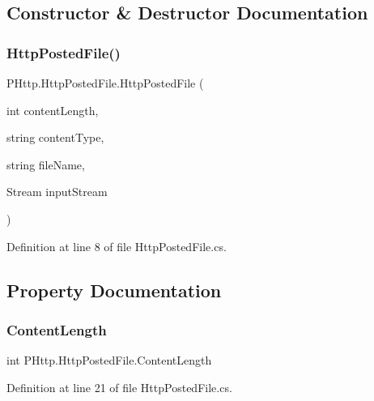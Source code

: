 \subsection{Constructor \& Destructor Documentation}
\mbox{\label{class_p_http_1_1_http_posted_file_a81377359a071ee5808f7e99bb80d6a29}} 
\subsubsection{\texorpdfstring{Http\+Posted\+File()}{HttpPostedFile()}}
{\footnotesize\ttfamily P\+Http.\+Http\+Posted\+File.\+Http\+Posted\+File (\begin{DoxyParamCaption}\item[{int}]{content\+Length,  }\item[{string}]{content\+Type,  }\item[{string}]{file\+Name,  }\item[{Stream}]{input\+Stream }\end{DoxyParamCaption})}



Definition at line 8 of file Http\+Posted\+File.\+cs.



\subsection{Property Documentation}
\mbox{\label{class_p_http_1_1_http_posted_file_ad3e3b683b2e745613493026d1e9dec48}} 
\subsubsection{\texorpdfstring{Content\+Length}{ContentLength}}
{\footnotesize\ttfamily int P\+Http.\+Http\+Posted\+File.\+Content\+Length\hspace{0.3cm}{\ttfamily [get]}}



Definition at line 21 of file Http\+Posted\+File.\+cs.

